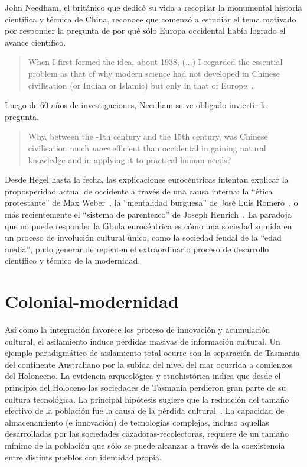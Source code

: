 \documentclass[a4paper,10pt]{book}
\theoremstyle{definition}
\begin{document}

John Needham, el británico que dedicó su vida a recopilar la monumental historia científica y técnica de China, reconoce que comenzó a estudiar el tema motivado por responder la pregunta de por qué sólo Europa occidental había logrado el avance científico.
\begin{quotation}
When I first formed the idea, about 1938, (...) I regarded the essential problem as that of why modern science had not developed in Chinese civilisation (or Indian or Islamic) but only in that of Europe~\cite{needham2004-generalConclusionsAndReflections}.%
\end{quotation}
Luego de 60 años de investigaciones, Needham se ve obligado inviertir la pregunta.
\begin{quotation}
Why, between the -1th century and the 15th century, was Chinese civilisation much \emph{more} efficient than occidental in gaining natural knowledge and in applying it to practical human needs?~\cite{needham2004-generalConclusionsAndReflections}
\end{quotation}


Desde Hegel hasta la fecha, las explicaciones eurocéntricas intentan explicar la proposperidad actual de occidente a través de una causa interna: la ``ética protestante'' de Max Weber~\cite{weber1905-eticaProtestante}, la ``mentalidad burguesa'' de José Luis Romero~\cite{romero1967-revolucionBurguesa}, o más recientemente el ``sistema de parentezco'' de Joseph Henrich~\cite{henrich2020-weirdest}.
La paradoja que no puede responder la fábula eurocéntrica es cómo una sociedad sumida en un proceso de involución cultural único, como la sociedad feudal de la ``edad media'', pudo generar de repenten el extraordinario proceso de desarrollo científico y técnico de la modernidad.

\section{Colonial-modernidad}

Así como la integración favorece los proceso de innovación y acumulación cultural, el asilamiento induce pérdidas masivas de información cultural.
%
Un ejemplo paradigmático de aislamiento total ocurre con la separación de Tasmania del continente Australiano por la subida del nivel del mar ocurrida a comienzos del Holonceno.
%
La evidencia arqueológica y etnohistórica indica que desde el principio del Holoceno las sociedades de Tasmania perdieron gran parte de su cultura tecnológica.
La principal hipótesis sugiere que la reducción del tamaño efectivo de la población fue la causa de la pérdida cultural~\cite{Henrich2004}.
%
La capacidad de almacenamiento (e innovación) de tecnologías complejas, incluso aquellas desarrolladas por las sociedades cazadoras-recolectoras, requiere de un tamaño mínimo de la población que sólo se puede alcanzar a través de la coexistencia entre distints pueblos con identidad propia.
\end{document}
